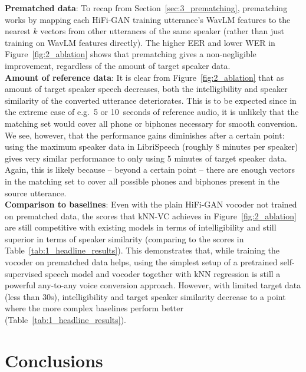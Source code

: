 \documentclass{INTERSPEECH2023}
\def\modelname{{kNN-VC}}
\begin{document}
\noindent \textbf{Prematched data}: 
To recap from Section~\ref{sec:3_prematching}, prematching works by mapping each HiFi-GAN training utterance's WavLM features to the nearest $k$ vectors from other utterances of the same speaker (rather than just training on WavLM features directly). The higher EER and lower WER in Figure~\ref{fig:2_ablation} shows that prematching gives
a non-negligible improvement, regardless of the amount of target speaker data. \\ 
\noindent \textbf{Amount of reference data}: 
It is clear from Figure~\ref{fig:2_ablation} that as
amount of target speaker speech
decreases,
both the intelligibility and speaker similarity of the converted utterance deteriorates.
This is to be expected since in the extreme case of e.g.\ 5 or 10~seconds of reference audio, it is unlikely that the matching set 
would cover
all phone or biphones necessary for smooth conversion.
We see, however, that the performance gains diminishes after a certain point:
using the maximum speaker data in LibriSpeech (roughly 8 minutes per speaker)
gives
very similar performance to only using 5 minutes of target speaker data.
Again, this is likely because -- beyond a certain point -- there are enough vectors in the matching set to cover all possible phones and biphones present in the source utterance. \\

\noindent \textbf{Comparison to baselines}: Even with the plain HiFi-GAN vocoder not trained on prematched data, the scores that \modelname{} achieves in Figure~\ref{fig:2_ablation} are still competitive with existing models in terms of intelligibility and still superior in terms of speaker similarity (comparing to the scores in Table~\ref{tab:1_headline_results}).
This demonstrates that, while training the vocoder on prematched data helps, using the simplest setup of a pretrained self-supervised speech model and vocoder together with kNN regression is still a powerful any-to-any voice conversion approach. However, with limited target data (less than 30s),  intelligibility and target speaker similarity decrease to a point where the more complex baselines perform better (Table~\ref{tab:1_headline_results}).


\section{Conclusions}
\end{document}
